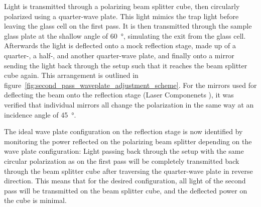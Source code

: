 Light is transmitted through a polarizing beam splitter cube, then circularly polarized using a quarter-wave plate. This light mimics the trap light before leaving the glass cell on the first pass. It is then transmitted through the sample glass plate at the shallow angle of \SI{60}{\degree}, simulating the exit from the glass cell. Afterwards the light is deflected onto a mock reflection stage, made up of a quarter-, a half-, and another quarter-wave plate, and finally onto a mirror sending the light back through the setup such that it reaches the beam splitter cube again. This arrangement is outlined in figure~\ref{fig:second_pass_waveplate_adjustment_scheme}. For the mirrors used for deflecting the beam onto the reflection stage (Laser Componenets ), it was verified that individual mirrors all change the polarization in the same way at an incidence angle of \SI{45}{\degree}.

The ideal wave plate configuration on the reflection stage is now identified by monitoring the power reflected on the polarizing beam splitter depending on the wave plate configuration: Light passing back through the setup with the same circular polarization as on the first pass will be completely transmitted back through the beam splitter cube after traversing the quarter-wave plate in reverse direction. This means that for the desired configuration, all light of the second pass will be transmitted on the beam splitter cube, and the deflected power on the cube is minimal.

